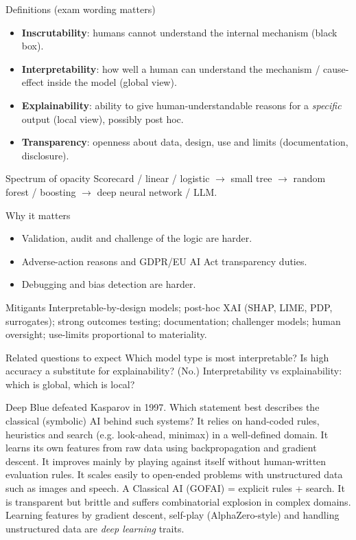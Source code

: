 {\begin{block}{Definitions (exam wording matters)}
		\begin{itemize}
			\item \textbf{Inscrutability}: humans cannot understand the internal mechanism (black box).
			\item \textbf{Interpretability}: how well a human can understand the mechanism / cause-effect inside the model (global view).
			\item \textbf{Explainability}: ability to give human-understandable reasons for a \emph{specific} output (local view), possibly post hoc.
			\item \textbf{Transparency}: openness about data, design, use and limits (documentation, disclosure).
	\end{itemize}\end{block}
	\begin{block}{Spectrum of opacity}
		Scorecard / linear / logistic $\rightarrow$ small tree $\rightarrow$ random forest / boosting $\rightarrow$ deep neural network / LLM.
\end{block}}
{\begin{block}{Why it matters}
		\begin{itemize}
			\item Validation, audit and challenge of the logic are harder.
			\item Adverse-action reasons and GDPR/EU AI Act transparency duties.
			\item Debugging and bias detection are harder.
	\end{itemize}\end{block}
	\begin{block}{Mitigants}
		Interpretable-by-design models; post-hoc XAI (SHAP, LIME, PDP, surrogates); strong outcomes testing; documentation; challenger models; human oversight; use-limits proportional to materiality.
	\end{block}
	\begin{alertblock}{Related questions to expect}
		Which model type is most interpretable? Is high accuracy a substitute for explainability? (No.) Interpretability vs explainability: which is global, which is local?
\end{alertblock}}

{Deep Blue defeated Kasparov in 1997. Which statement best describes the classical (symbolic) AI behind such systems?}
{It relies on hand-coded rules, heuristics and search (e.g. look-ahead, minimax) in a well-defined domain.}
{It learns its own features from raw data using backpropagation and gradient descent.}
{It improves mainly by playing against itself without human-written evaluation rules.}
{It scales easily to open-ended problems with unstructured data such as images and speech.}
{A}
{Classical AI (GOFAI) = explicit rules + search. It is transparent but brittle and suffers combinatorial explosion in complex domains. Learning features by gradient descent, self-play (AlphaZero-style) and handling unstructured data are \emph{deep learning} traits.}


